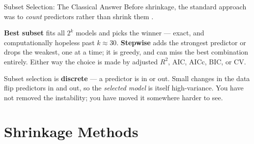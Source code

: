 \documentclass[aspectratio=169, 11pt]{beamer}
\begin{document}
\begin{frame}{Subset Selection: The Classical Answer}
  Before shrinkage, the standard approach was to \emph{count} predictors rather than shrink
  them \parencite{Guyon2003}.

  \vspace{0.15cm}
  \textbf{Best subset} fits all $2^k$ models and picks the winner --- exact, and
  computationally hopeless past $k \approx 30$. \textbf{Stepwise} adds the strongest predictor
  or drops the weakest, one at a time; it is greedy, and can miss the best combination
  entirely. Either way the choice is made by adjusted $R^2$, AIC, AICc, BIC, or CV.
  \begin{warningbox}
    Subset selection is \textbf{discrete} --- a predictor is in or out. Small changes in the
    data flip predictors in and out, so the \emph{selected model} is itself high-variance.
    You have not removed the instability; you have moved it somewhere harder to see.
  \end{warningbox}

  \vspace{0.1cm}
\end{frame}

\section{Shrinkage Methods}

\end{document}
